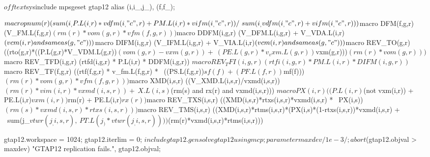 \begin{GAMSCode*}
$offtext
$sysinclude mpsgeset gtap12
alias (i,i_,j_), (f,f_);

$macro pnum(r)          (sum(i_, P.L(i_,r)*vdfm(i_,"c",r)+PM.L(i_,r)*vifm(i_,"c",r)) / \
                                sum(i_,vdfm(i_,"c",r)+vifm(i_,"c",r)))
$macro DFM(f,g,r)       (V_FM.L(f,g,r)$(rm(r)*vom(g,r)*vfm(f,g,r)))
$macro DDFM(i,g,r)      (V_DFM.L(i,g,r) + V_VDA.L(i,r)$(vcm(i,r) and sameas(g,"c")))
$macro DIFM(i,g,r)      (V_IFM.L(i,g,r) + V_VIA.L(i,r)$(vcm(i,r) and sameas(g,"c")))
$macro REV_TO(g,r)      ((rto(g,r)*((P.L(g,r)*V_VDM.L(g,r))$(vom(g,r)-vxm(g,r)) + \
                        (PE.L(g,r)*v_vxm.L(g,r))$vxm(g,r)))$(rm(r)*vom(g,r)))
$macro REV_TFD(i,g,r)   (rtfd(i,g,r) * P.L(i,r)  * DDFM(i,g,r))
$macro REV_TFI(i,g,r)   (rtfi(i,g,r) * PM.L(i,r) * DIFM(i,g,r))
$macro REV_TF(f,g,r)    ((rtf(f,g,r)  * v_fm.L(f,g,r) * \
                        ((PS.L(f,g,r))$sf(f)+(PF.L(f,r))$mf(f)))$(rm(r)*vom(g,r)*vfm(f,g,r)))
$macro XMD(i,s,r)       ((V_XMD.L(i,s,r)/vxmd(i,s,r))$(rm(r)*vim(i,r)*vxmd(i,s,r)) + \
                         X.L(i,s)$(rm(s) and rx(r) and vxmd(i,s,r)))
$macro PX(i,r)          ((P.L(i,r)$(not vxm(i,r)) + PE.L(i,r)$vxm(i,r))$rm(r) + PE.L(i,r)$rx(r))
$macro REV_TXS(i,s,r)   ((XMD(i,s,r)*rtxs(i,s,r)*vxmd(i,s,r) * \
                                PX(i,s))$(rm(s)*vxmd(i,s,r)*rtxs(i,s,r)))
$macro REV_TMS(i,s,r)   ((XMD(i,s,r)*rtms(i,s,r)*(PX(i,s)*(1-rtxs(i,s,r))*vxmd(i,s,r)  + \
                         sum(j_$vtwr(j_,i,s,r), \
                                PT.L(j_)*vtwr(j_,i,s,r))))$(rm(r)*vxmd(i,s,r)*rtms(i,s,r)))

gtap12.workspace = 1024;
gtap12.iterlim = 0;
$include gtap12.gen
solve gtap12 using mcp;

parameter       maxdev /1e-3/;
abort$(gtap12.objval > maxdev) "GTAP12 replication fails.", gtap12.objval;
\end{GAMSCode*}
